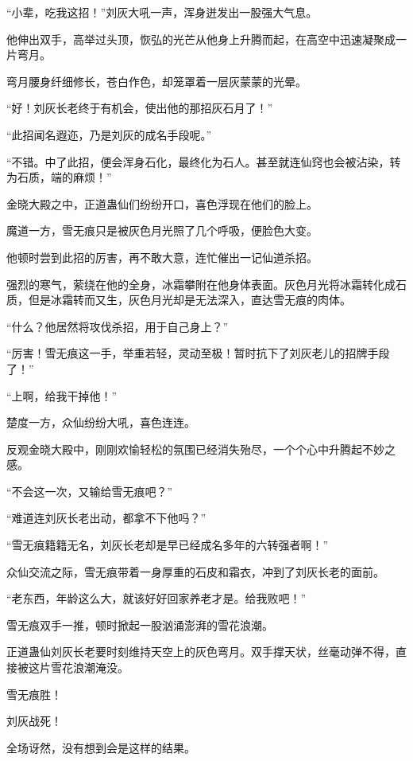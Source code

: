 
\begin{this_body}

“小辈，吃我这招！”刘灰大吼一声，浑身迸发出一股强大气息。

他伸出双手，高举过头顶，恢弘的光芒从他身上升腾而起，在高空中迅速凝聚成一片弯月。

弯月腰身纤细修长，苍白作色，却笼罩着一层灰蒙蒙的光晕。

“好！刘灰长老终于有机会，使出他的那招灰石月了！”

“此招闻名遐迩，乃是刘灰的成名手段呢。”

“不错。中了此招，便会浑身石化，最终化为石人。甚至就连仙窍也会被沾染，转为石质，端的麻烦！”

金晓大殿之中，正道蛊仙们纷纷开口，喜色浮现在他们的脸上。

魔道一方，雪无痕只是被灰色月光照了几个呼吸，便脸色大变。

他顿时尝到此招的厉害，再不敢大意，连忙催出一记仙道杀招。

强烈的寒气，萦绕在他的全身，冰霜攀附在他身体表面。灰色月光将冰霜转化成石质，但是冰霜转而又生，灰色月光却是无法深入，直达雪无痕的肉体。

“什么？他居然将攻伐杀招，用于自己身上？”

“厉害！雪无痕这一手，举重若轻，灵动至极！暂时抗下了刘灰老儿的招牌手段了！”

“上啊，给我干掉他！”

楚度一方，众仙纷纷大吼，喜色连连。

反观金晓大殿中，刚刚欢愉轻松的氛围已经消失殆尽，一个个心中升腾起不妙之感。

“不会这一次，又输给雪无痕吧？”

“难道连刘灰长老出动，都拿不下他吗？”

“雪无痕籍籍无名，刘灰长老却是早已经成名多年的六转强者啊！”

众仙交流之际，雪无痕带着一身厚重的石皮和霜衣，冲到了刘灰长老的面前。

“老东西，年龄这么大，就该好好回家养老才是。给我败吧！”

雪无痕双手一推，顿时掀起一股汹涌澎湃的雪花浪潮。

正道蛊仙刘灰长老要时刻维持天空上的灰色弯月。双手撑天状，丝毫动弹不得，直接被这片雪花浪潮淹没。

雪无痕胜！

刘灰战死！

全场讶然，没有想到会是这样的结果。


\end{this_body}
